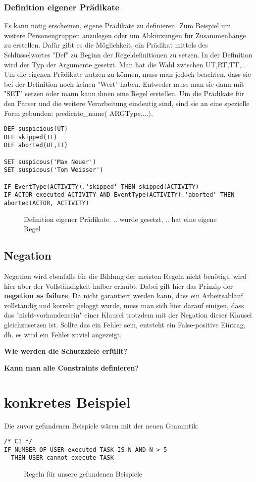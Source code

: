 \subsubsection{Definition eigener Prädikate}
Es kann nötig erscheinen, eigene Prädikate zu definieren. Zum Beispiel um weitere Personengruppen anzulegen oder um Abkürzungen für Zusammenhänge zu erstellen. Dafür gibt es die Möglichkeit, ein Prädikat mittels des Schlüsselwortes "Def" zu Beginn der Regeldefinitionen zu setzen. In der Definition wird der Typ der Argumente gesetzt. Man hat die Wahl zwischen UT,RT,TT,...
Um die eigenen Prädikate nutzen zu können, muss man jedoch beachten, dass sie bei der Definition noch keinen "Wert" haben. Entweder muss man sie dann mit "SET" setzen oder mann kann ihnen eine Regel erstellen. Um die Prädikate für den Parser und die weitere Verarbeitung eindeutig sind, sind sie an eine spezielle Form gebunden: predicate{\_}name( ARGType,...).

\begin{verbatim}
DEF suspicious(UT)
DEF skipped(TT)
DEF aborted(UT,TT)

SET suspicous('Max Neuer')
SET suspicous('Tom Weisser')

IF EventType(ACTIVITY).'skipped' THEN skipped(ACTIVITY)
IF ACTOR executed ACTIVITY AND EventType(ACTIVITY).'aborted' THEN aborted(ACTOR, ACTIVITY)
\end{verbatim}
\begin{figure}[!h]
\caption{Definition eigener Prädikate. .. wurde gesetzt, .. hat eine eigene Regel}
\label{fig:define}
\end{figure}

\subsection{Negation}
Negation wird ebenfalls für die Bildung der meisten Regeln nicht benötigt, wird hier aber der Vollständigkeit halber erlaubt. Dabei gilt hier das Prinzip der \textbf{negation as failure}. Da nicht garantiert werden kann, dass ein Arbeitsablauf vollständig und korrekt geloggt wurde, muss man sich hier darauf einigen, dass das "nicht-vorhandensein" einer Klausel trotzdem mit der Negation dieser Klausel gleichzusetzen ist. Sollte das ein Fehler sein, entsteht ein False-positive Eintrag, dh. es wird ein Fehler zuviel angezeigt.

\textbf{Wie werden die Schutzziele erfüllt?}

\textbf{Kann man alle Constraints definieren?}

%
%
\section{konkretes Beispiel}
Die zuvor gefundenen Beispiele wären mit der neuen Grammtik:\\
\begin{verbatim}
/* C1 */
IF NUMBER OF USER executed TASK IS N AND N > 5
  THEN USER cannot execute TASK
\end{verbatim}
\begin{figure}[!h]
\caption{Regeln für unsere gefundenen Beispiele}
\label{fig:resultrulefile}
\end{figure}
